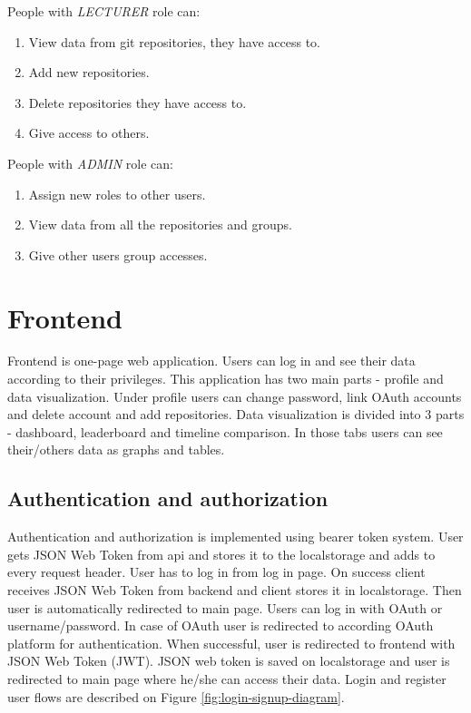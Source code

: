 People with \textit{LECTURER} role can:
\begin{enumerate}
    \item View data from git repositories, they have access to.
    \item Add new repositories.
    \item Delete repositories they have access to.
    \item Give access to others.
\end{enumerate}

People with \textit{ADMIN} role can:
\begin{enumerate}
    \item Assign new roles to other users.
    \item View data from all the repositories and groups.
    \item Give other users group accesses.
\end{enumerate}

\section{Frontend}\label{sec:frontend-content}
Frontend is one-page web application.
Users can log in and see their data according to their privileges.
This application has two main parts - profile and data visualization.
Under profile users can change password, link OAuth accounts and delete account and add repositories.
Data visualization is divided into 3 parts - dashboard, leaderboard and timeline comparison.
In those tabs users can see their/others data as graphs and tables.

\subsection{Authentication and authorization}\label{subsec:authentication-and-authorization}
Authentication and authorization is implemented using bearer token system.
User gets JSON Web Token from api and stores it to the localstorage and adds to every request header.
User has to log in from log in page.
On success client receives JSON Web Token from backend and client stores it in localstorage.
Then user is automatically redirected to main page.
Users can log in with OAuth or username/password.
In case of OAuth user is redirected to according OAuth platform for authentication.
When successful, user is redirected to frontend with JSON Web Token (JWT).
JSON web token is saved on localstorage and user is redirected to main page where he/she can access their data.
Login and register user flows are described on Figure
\ref{fig:login-signup-diagram}.

